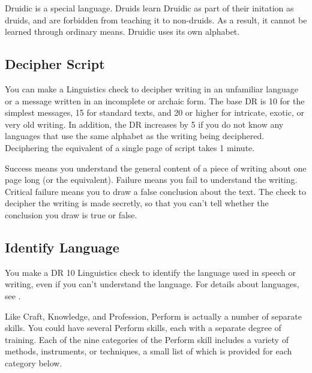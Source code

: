         Druidic is a special language.
        Druids learn Druidic as part of their initation as druids, and are forbidden from teaching it to non-druids.
        As a result, it cannot be learned through ordinary means.
        Druidic uses its own alphabet.

    \subsection{Decipher Script}
        You can make a Linguistics check to decipher writing in an unfamiliar language or a message written in an incomplete or archaic form. The base DR is 10 for the simplest messages, 15 for standard texts, and 20 or higher for intricate, exotic, or very old writing. In addition, the DR increases by 5 if you do not know any languages that use the same alphabet as the writing being deciphered. Deciphering the equivalent of a single page of script takes 1 minute.

        Success means you understand the general content of a piece of writing about one page long (or the equivalent). Failure means you fail to understand the writing. Critical failure means you to draw a false conclusion about the text. The check to decipher the writing is made secretly, so that you can't tell whether the conclusion you draw is true or false.

    \subsection{Identify Language}
        You make a DR 10 Linguistics check to identify the language used in speech or writing, even if you can't understand the language.
        For details about languages, see .

\newpage
{}
        \par Like Craft, Knowledge, and Profession, Perform is actually a number of separate skills.
        You could have several Perform skills, each with a separate degree of training.
        Each of the nine categories of the Perform skill includes a variety of methods, instruments, or techniques, a small list of which is provided for each category below.

